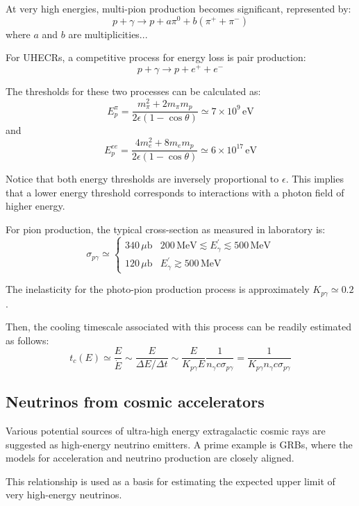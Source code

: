 At very high energies, multi-pion production becomes significant, represented by:
%
\[
p + \gamma \rightarrow p + a \pi^0 + b ( \pi^+ + \pi^-)
\]
%
where $a$ and $b$ are multiplicities...

For UHECRs, a competitive process for energy loss is pair production:
%
\[
p + \gamma \rightarrow p + e^+ + e^-
\]

The thresholds for these two processes can be calculated as:
%
\[
E_p^\pi = \frac{m_\pi^2 + 2 m_\pi m_p}{2 \epsilon (1 - \cos \theta)} \simeq 7 \times 10^9 \, \text{eV}
\]
and
\[
E_p^{ee} = \frac{4 m_e^2 + 8 m_e m_p}{2\epsilon (1 - \cos\theta)} \simeq 6 \times 10^{17} \, \text{eV}
\]

Notice that both energy thresholds are inversely proportional to \(\epsilon\). This implies that a lower energy threshold corresponds to interactions with a photon field of higher energy.

For pion production, the typical cross-section as measured in laboratory is:
%
\[
\sigma_{p\gamma} \simeq 
\begin{cases}
340 \, \mu\text{b} & 200 \, \text{MeV} \lesssim E^\prime_\gamma \lesssim 500 \, \text{MeV} \\
120 \, \mu\text{b} & E^\prime_\gamma \gtrsim 500 \, \text{MeV}
\end{cases}
\]

The inelasticity for the photo-pion production process is approximately \(K_{p\gamma} \simeq 0.2\).

Then, the cooling timescale associated with this process can be readily estimated as follows:
\[
t_c(E) \simeq \frac{E}{\dot E} \sim \frac{E}{\Delta E / \Delta t} \sim \frac{E}{K_{p\gamma} E} \frac{1}{n_\gamma c \sigma_{p\gamma}} = \frac{1}{K_{p\gamma} n_\gamma c \sigma_{p\gamma}}
\]

\subsection{Neutrinos from cosmic accelerators}

Various potential sources of ultra-high energy extragalactic cosmic rays are suggested as high-energy neutrino emitters. A prime example is GRBs, where the models for acceleration and neutrino production are closely aligned.

This relationship is used as a basis for estimating the expected upper limit of very high-energy neutrinos.


